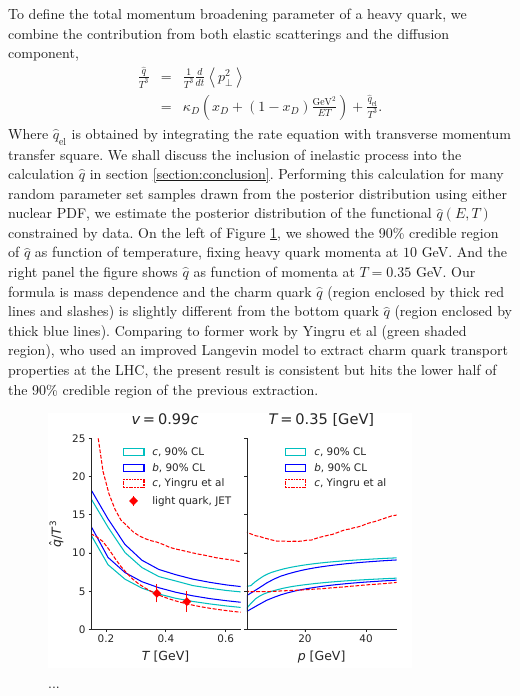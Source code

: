 \documentclass[aps, prc, reprint, amsmath, groupedaddress, nofootinbib]{revtex4-1}
\begin{document}
To define the total momentum broadening parameter of a heavy quark,
we combine the contribution from both elastic scatterings and the diffusion component,
\begin{eqnarray}\label{eq:qhat}
\frac{\hat{q}}{T^3} &=& \frac{1}{T^3}\frac{d}{dt}\left\langle p_\perp^2 \right\rangle\\
\nonumber
 &=&  \kappa_D\left(x_D + (1-x_D)\frac{\textrm{GeV}^2}{ET}\right) + \frac{\hat{q}_{\textrm{el}}}{T^3}.
\end{eqnarray}
Where $\hat{q}_{\textrm{el}}$ is obtained by integrating the rate equation with transverse momentum transfer square.
We shall discuss the inclusion of inelastic process into the calculation $\hat{q}$ in section \ref{section:conclusion}.
Performing this calculation for many random parameter set samples drawn from the posterior distribution using either nuclear PDF, we estimate the posterior distribution of the functional $\hat{q}(E, T)$ constrained by data.
On the left of Figure \ref{plots:posterior_qhat}, we showed the 90\% credible region of $\hat{q}$ as function of temperature, fixing heavy quark momenta at $10$ GeV.
And the right panel the figure shows $\hat{q}$ as function of momenta at $T=0.35$ GeV.
Our formula is mass dependence and the charm quark $\hat{q}$ (region enclosed by thick red lines and slashes) is slightly different from the bottom quark $\hat{q}$ (region enclosed by thick blue lines).
Comparing to former work by Yingru et al (green shaded region), who used an improved Langevin model to extract charm quark transport properties at the LHC, the present result is consistent but hits the lower half of the 90\% credible region of the previous extraction.
\begin{figure}
\includegraphics[width=\columnwidth]{qhat_p_T.pdf}
\caption{...}\label{plots:posterior_qhat}
\end{figure}
\end{document}
